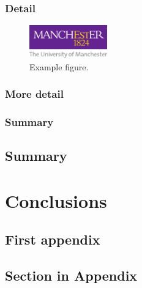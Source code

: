 \documentclass[times,thesis]{uom_thesis_casson} %
\begin{document}
	\subsection{Detail}
    \lipsum[1-2] \cite{ref:jCAS10,ref:jCAS09,ref:jCAS09a} \lipsum[3-5]
	\begin{figure}
      \centering
      \includegraphics[width=0.3\textwidth]{uom_logo.pdf}
      \caption{Example figure.}
      \label{fig:uom_logo}
    \end{figure} 
    
	\subsection{More detail}
	\lipsum[1-2] \cite{ref:jCAS10,ref:jCAS09,ref:jCAS09a} \lipsum[3-5]
	
	\subsection{Summary}
	\lipsum[1]
  
  \section{Summary}
  \lipsum[6]
  
  \printbibliography[title={References},heading=subbibintoc] %

  
\chapter{Conclusions}


\begin{uomappendix} 
  \chapter{First appendix}
    \section{Section in Appendix}
    \lipsum[1-6]
\end{uomappendix}


\end{document}
